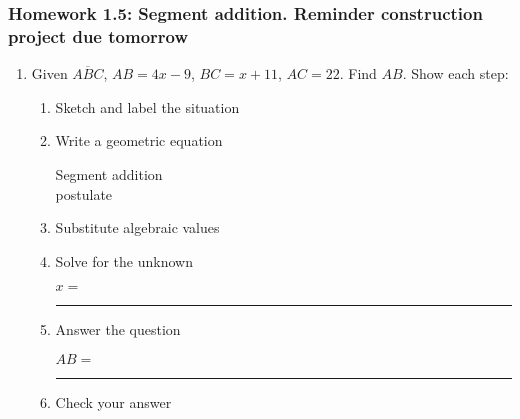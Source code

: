 \documentclass[12pt, oneside]{article}
\begin{document}
\subsubsection*{Homework 1.5: Segment addition. Reminder construction project due tomorrow}
  \begin{enumerate}
    \item Given $\overline{ABC}$, $AB=4x-9$, $BC=x+11$, $AC=22$. Find ${AB}$. Show each step:\\[0.5in]
    \begin{center}
    \end{center}
      \vspace{1cm}
    \begin{enumerate}
      \item Sketch and label the situation
      \item Write a geometric equation\\
      \begin{flushright} Segment addition\\ postulate \end{flushright}
      \item Substitute algebraic values
      \item Solve for the unknown \vspace{3cm}
      \begin{center} $x=$ \rule{1cm}{0.15} \end{center}
      \item Answer the question\\
      \begin{center} $AB=$ \rule{1cm}{0.15} \end{center}
      \item Check your answer
    \end{enumerate}


  \end{enumerate}

\newpage
\end{document}
